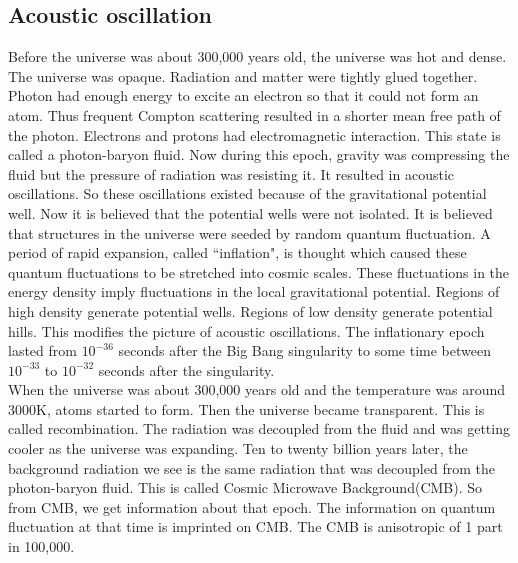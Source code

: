 \documentclass[12pt]{report}
\begin{document}
\subsection{Acoustic oscillation}
 
  
  
 
Before the universe was about 300,000 years old, the universe was hot and dense. The universe was opaque. Radiation and matter were tightly glued together.  Photon had enough energy to excite an electron so that it could not form an atom. Thus frequent Compton scattering resulted in a shorter mean free path of the photon. Electrons and protons had electromagnetic interaction.  This state is called a photon-baryon fluid. Now during this epoch, gravity was compressing the fluid but the pressure of radiation was resisting it. It resulted in acoustic oscillations. So these oscillations existed because of the gravitational potential well. Now it is believed that the potential wells were not isolated. It is believed that structures in the universe were seeded by random quantum fluctuation. A period of rapid expansion, called ``inflation", is thought which caused these quantum fluctuations to be stretched into cosmic scales. These fluctuations in the energy density imply fluctuations in the local gravitational potential.  Regions of high density generate potential wells. Regions of low density generate potential hills. This modifies the picture of acoustic oscillations. The inflationary epoch lasted from $10^{-36}$ seconds after the Big Bang singularity to some time between $10^{-33}$ to $10^{-32}$ seconds after the singularity. \cite{whu} \\

When the universe was about 300,000 years old and the temperature was around 3000K, atoms started to form. Then the universe became transparent. This is called recombination. The radiation was decoupled from the fluid and was getting cooler as the universe was expanding. Ten to twenty billion years later, the background radiation we see is the same radiation that was decoupled from the photon-baryon fluid. This is called Cosmic Microwave Background(CMB). So from CMB, we get information about that epoch. The information on quantum fluctuation at that time is imprinted on CMB. The CMB is anisotropic of 1 part in 100,000. \cite{whu} \\
\end{document}
